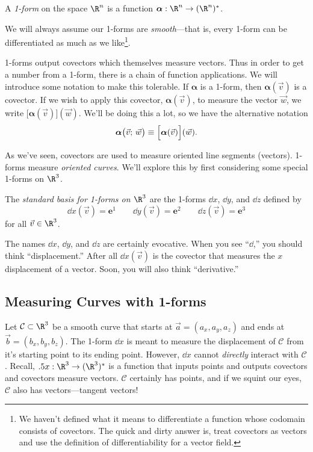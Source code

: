 \begin{definition}[1-form]
	A \emph{1-form} on the space $\R^n$ is a function
	$\bm \alpha: \R^n\to (\R^n)^*$.
\end{definition}
We will always assume our 1-forms are \emph{smooth}---that is, every 1-form
can be differentiated as much as we like\footnote{ We haven't defined
what it means to differentiate a function whose codomain consists of covectors.
The quick and dirty answer is, treat covectors as vectors and use
the definition of differentiability for a vector field.}.

1-forms output covectors which themselves measure vectors.
Thus in order to get a number from a 1-form, there is a chain
of function applications.  We will introduce some notation to make this
tolerable.  If $\bm \alpha$ is a 1-form, then
$\bm \alpha(\vec v)$ is a covector.  If we wish to apply this
covector, $\bm\alpha(\vec v)$,
to measure the vector $\vec w$, we write $\Big[\bm\alpha(\vec v)\Big](\vec w)$.
We'll be doing this a lot, so we have the alternative notation
\[
	\bm\alpha\big(\vec v;\, \vec w\big)  \equiv\Big[\bm\alpha(\vec v)\Big](\vec w).
\]


As we've seen, covectors are used to measure oriented line
segments (vectors).  1-forms measure \emph{oriented curves}.  We'll explore this by
first considering some special 1-forms on $\R^3$.

\begin{definition}
	The
	\emph{standard basis for 1-forms on $\R^3$} are the 1-forms
	$\dd x$, $\dd y$, and $\dd z$ defined by
	\[
		\dd x(\vec v) = \bm e^1\qquad \dd y(\vec v)=\bm e^2\qquad
		\dd z(\vec v) = \bm e^3
	\]
	for all $\vec v\in \R^3$.
\end{definition}

The names $\dd x$, $\dd y$, and $\dd z$
are certainly evocative.  When you see
``$\dd$,'' you should think ``displacement.''  After all
$\dd x(\vec v)$ is the covector that measures the $x$ displacement
of a vector.  Soon, you will
also think ``derivative.''

\subsection{Measuring Curves with 1-forms}

Let $\mathcal C\subset \R^3$ be a smooth curve that starts at $\vec a=(a_x,a_y,a_z)$
and ends at $\vec b=(b_x,b_y,b_z)$.  The 1-form $\dd x$ is meant to measure the
displacement of $\mathcal C$ from it's starting point to its ending point.
However, $\dd x$ cannot \emph{directly} interact with $\mathcal C$.
Recall, $\dd x:\R^3\to (\R^3)^*$ is a function that inputs points
and outputs covectors and covectors measure vectors.  $\mathcal C$ certainly
has points, and if we squint our eyes, $\mathcal C$ also has vectors---tangent
vectors!

